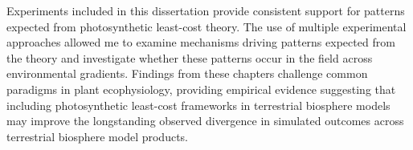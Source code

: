 \documentclass{ttuthes2007}
\begin{document}
Experiments included in this dissertation provide consistent support for patterns expected from photosynthetic least-cost theory. The use of multiple experimental approaches allowed me to examine mechanisms driving patterns expected from the theory and investigate whether these patterns occur in the field across environmental gradients. Findings from these chapters challenge common paradigms in plant ecophysiology, providing empirical evidence suggesting that including photosynthetic least-cost frameworks in terrestrial biosphere models may improve the longstanding observed divergence in simulated outcomes across terrestrial biosphere model products.

\listoftables
\listoffigures

\mainmatter








\end{document}
